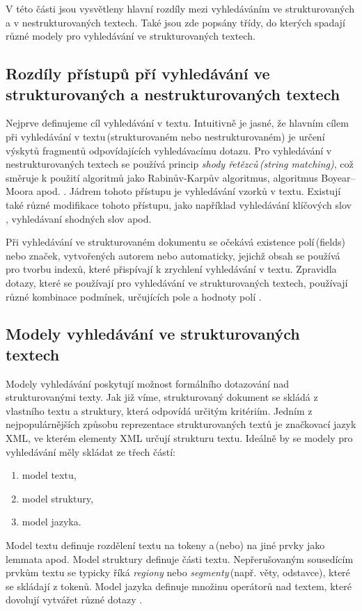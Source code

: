 V této části jsou vysvětleny hlavní rozdíly mezi vyhledáváním ve strukturovaných a v nestrukturovaných textech. Také jsou zde popsány třídy, do kterých spadají různé modely pro vyhledávání ve strukturovaných textech.


\subsection{Rozdíly přístupů pří vyhledávání ve strukturovaných a nestrukturovaných textech}

Nejprve definujeme cíl vyhledávání v textu. Intuitivně je jasné, že hlavním cílem při vyhledávání v textu\,(strukturovaném nebo nestrukturovaném) je určení výskytů fragmentů odpovídajících vyhledávacímu dotazu. Pro vyhledávání v nestrukturovaných textech se používá princip \emph{shody řetězců\,(string matching)}, což směruje k použití algoritmů jako Rabinův-Karpův algoritmus, algoritmus Boyear–Moora apod. \cite{books/daglib/0029345}.  Jádrem tohoto přístupu je vyhledávání vzorků v textu. Existují také různé modifikace tohoto přístupu, jako například vyhledávání klíčových slov \cite{TEXT_ANALYZER}, vyhledávaní shodných slov apod. 

Při vyhledávání ve strukturovaném dokumentu se očekává existence polí\,(fields) nebo značek, vytvořených autorem nebo automaticky, jejichž obsah se používá pro tvorbu indexů, které přispívají k zrychlení vyhledávání v textu. Zpravidla dotazy, které se používají pro vyhledávání ve strukturovaných textech, používají různé kombinace podmínek,  určujících pole a hodnoty polí \cite{Zhao:2009:EES:1645953.1646175} \cite{Luo:2012:ITR:2900728.2900821}.

\subsection{Modely vyhledávání ve strukturovaných textech}

Modely vyhledávání poskytují možnost formálního dotazování nad strukturovanými texty. Jak již víme, strukturovaný dokument se skládá z vlastního textu a struktury, která odpovídá určitým kritériím. Jedním z nejpopulárnějších způsobu reprezentace strukturovaných textů je značkovací jazyk XML, ve kterém elementy XML určují strukturu textu. Ideálně by se modely pro vyhledávání  měly skládat ze třech částí: 
\begin{enumerate}
\item model textu,
\item model struktury,
\item model jazyka.
\end{enumerate}
Model textu definuje rozdělení textu na tokeny a\,(nebo) na jiné prvky jako lemmata apod. Model struktury definuje části textu. Nepřerušovaným sousedícím prvkům textu se typicky říká  \emph{regiony} nebo \emph{segmenty}\,(např. věty, odstavce), které se skládají z tokenů.  Model jazyka definuje množinu operátorů nad textem, které dovolují vytvářet různé dotazy \cite{STRUCTURED_TEXT_RETRIEVAL_MODELS}.

